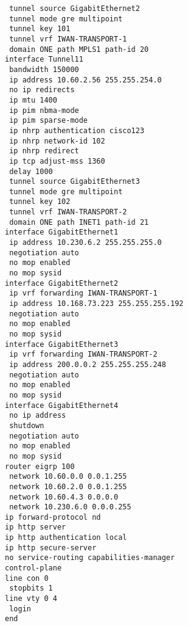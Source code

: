 \begin{lstlisting}
 tunnel source GigabitEthernet2
 tunnel mode gre multipoint
 tunnel key 101
 tunnel vrf IWAN-TRANSPORT-1
 domain ONE path MPLS1 path-id 20
interface Tunnel11
 bandwidth 150000
 ip address 10.60.2.56 255.255.254.0
 no ip redirects
 ip mtu 1400
 ip pim nbma-mode
 ip pim sparse-mode
 ip nhrp authentication cisco123
 ip nhrp network-id 102
 ip nhrp redirect
 ip tcp adjust-mss 1360
 delay 1000
 tunnel source GigabitEthernet3
 tunnel mode gre multipoint
 tunnel key 102
 tunnel vrf IWAN-TRANSPORT-2
 domain ONE path INET1 path-id 21
interface GigabitEthernet1
 ip address 10.230.6.2 255.255.255.0
 negotiation auto
 no mop enabled
 no mop sysid
interface GigabitEthernet2
 ip vrf forwarding IWAN-TRANSPORT-1
 ip address 10.168.73.223 255.255.255.192
 negotiation auto
 no mop enabled
 no mop sysid
interface GigabitEthernet3
 ip vrf forwarding IWAN-TRANSPORT-2
 ip address 200.0.0.2 255.255.255.248
 negotiation auto
 no mop enabled
 no mop sysid
interface GigabitEthernet4
 no ip address
 shutdown
 negotiation auto
 no mop enabled
 no mop sysid
router eigrp 100
 network 10.60.0.0 0.0.1.255
 network 10.60.2.0 0.0.1.255
 network 10.60.4.3 0.0.0.0
 network 10.230.6.0 0.0.0.255
ip forward-protocol nd
ip http server
ip http authentication local
ip http secure-server
no service-routing capabilities-manager
control-plane
line con 0
 stopbits 1
line vty 0 4
 login
end
\end{lstlisting}

